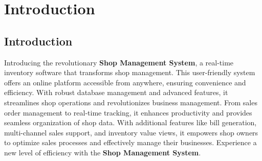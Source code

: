 \chapter{Introduction}
\section{Introduction}
Introducing the revolutionary \textbf{Shop Management System}, a real-time inventory software that transforms shop management. This user-friendly system offers an online platform accessible from anywhere, ensuring convenience and efficiency. With robust database management and advanced features, it streamlines shop operations and revolutionizes business management. From sales order management to real-time tracking, it enhances productivity and provides seamless organization of shop data. With additional features like bill generation, multi-channel sales support, and inventory value views, it empowers shop owners to optimize sales processes and effectively manage their businesses. Experience a new level of efficiency with the \textbf{Shop Management System}.




